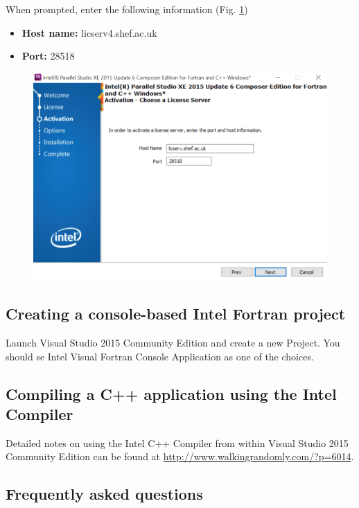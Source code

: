 \documentclass[10pt,a4paper,oneside]{article}
\begin{document}
When prompted, enter the following information (Fig. \ref{fig:VS5})
\begin{itemize}
\item \textbf{Host name:} licserv4.shef.ac.uk
\item \textbf{Port:} 28518
\end{itemize}
\begin{figure}[ht]
\centering
\includegraphics[scale=0.4]{VS5.png}
\caption{}
\label{fig:VS5}
\end{figure}

\subsection*{Creating a console-based Intel Fortran project}
Launch Visual Studio 2015 Community Edition and create a new Project. You should se Intel Visual Fortran Console Application as one of the choices. 

\subsection*{Compiling a C++ application using the Intel Compiler}
Detailed notes on using the Intel C++ 
Compiler from within Visual Studio 2015 Community Edition can be found at \url{http://www.walkingrandomly.com/?p=6014}.

\subsection*{Frequently asked questions}
\end{document}
